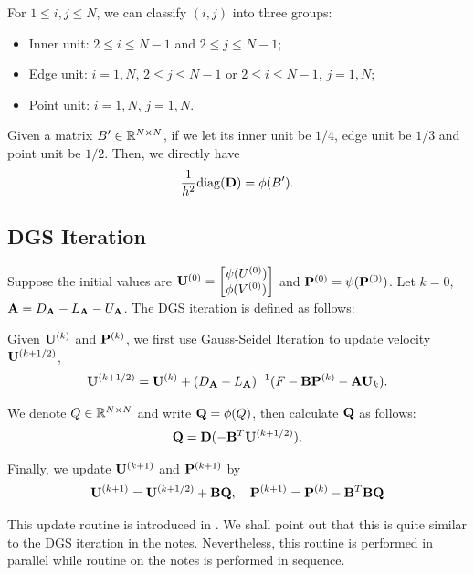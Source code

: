 \documentclass[english]{pkupaper}
\newenvironment{eqt}{\begin{equation}\begin{aligned}}{\end{aligned}\end{equation}}
\begin{document}
For $1\leq i,j\leq N$, we can classify $(i,j)$ into three groups:
\begin{itemize}
\item Inner unit: $2\leq i\leq N-1$ and $2\leq j\leq N-1$;
\item Edge unit: $i=1,N$, $2\leq j\leq N-1$ or $2\leq i\leq N-1$, $j=1,N$;
\item Point unit: $i=1,N$, $j=1,N$.
\end{itemize}
Given a matrix $B'\in \mathbb{R}^{N\times N}$, if we let its inner unit be $1/4$, edge unit be $1/3$ and point unit be $1/2$. Then, we directly have
\begin{eqt}
\label{btb}
\frac{1}{h^2}\mathrm{diag}(\mfD)=\phi(B').
\end{eqt}

\subsection{DGS Iteration}
Suppose the initial values are $\mathbf{U}^{(0)}=\begin{bmatrix}\psi(U^{(0)})\\ \phi(V^{(0)})\end{bmatrix}$ and $\mathbf{P}^{(0)}=\psi(\mathbf{P}^{(0)})$. Let $k=0$, $\mathbf{A}=D_{\mathbf{A}}-L_{\mathbf{A}}-U_{\mathbf{A}}$. 
The DGS iteration is defined as follows:

Given $\mathbf{U}^{(k)}$ and $\mathbf{P}^{(k)}$, we first use Gauss-Seidel Iteration to update velocity $\mathbf{U}^{(k+1/2)}$,
\begin{eqt}
\label{mfU}
\mfU^{(k+1/2)}=\mfU^{(k)}+(D_\mfA-L_\mfA)^{-1}(F-\mfB\mfP^{(k)}-\mfA\mfU_k).
\end{eqt}

We denote $Q\in\mathbb{R}^{N\times N}$ and write $\mathbf{Q}=\phi(Q)$, then calculate $\mathbf{Q}$ as follows:
\begin{eqt}
\label{mfQ}
\mfQ=\mfD(-\mfB^T \mfU^{(k+1/2)}).
\end{eqt}

Finally, we update $\mathbf{U}^{(k+1)}$ and $\mathbf{P}^{(k+1)}$ by
\begin{eqt}
\label{updup}
\mfU^{(k+1)}=\mfU^{(k+1/2)}+\mfB\mfQ, \quad \mfP^{(k+1)}=\mfP^{(k)}-\mfB^T\mfB\mfQ
\end{eqt}

This update routine is introduced in \cite{mmfts}. We shall point out that this is quite similar to the DGS iteration in the notes. Nevertheless, this routine is performed in parallel while routine on the notes is performed in sequence. 
\end{document}
